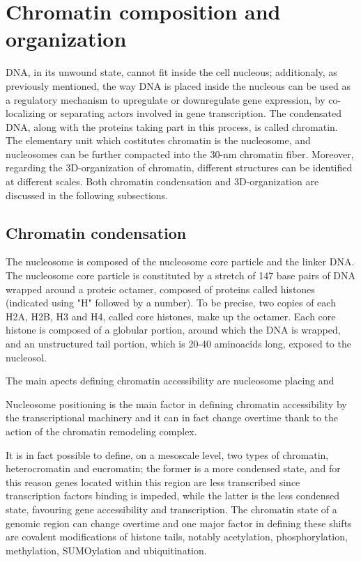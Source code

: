 \section{Chromatin composition and organization}

DNA, in its unwound state, cannot fit inside the cell nucleous; additionaly, as previously mentioned, the way DNA is placed inside the nucleous can be used as a regulatory mechanism to upregulate or downregulate gene expression, by co-localizing or separating actors involved in gene transcription. The condensated DNA, along with the proteins taking part in this process, is called chromatin. The elementary unit which costitutes chromatin is the nucleosome, and nucleosomes can be further compacted into the 30-nm chromatin fiber. Moreover, regarding the 3D-organization of chromatin, different structures can be identified at different scales. Both chromatin condensation and 3D-organization are discussed in the following subsections.

\subsection{Chromatin condensation}
The nucleosome is composed of the nucleosome core particle and the linker DNA. The nucleosome core particle is constituted by a stretch of 147 base pairs of DNA wrapped around a proteic octamer, composed of proteins called histones (indicated using "H" followed by a number). To be precise, two copies of each H2A, H2B, H3 and H4, called core histones, make up the octamer\cite{nucleosomecore1997}. Each core histone is composed of a globular portion, around which the DNA is wrapped, and an unstructured tail portion, which is 20-40 aminoacids long, exposed to the nucleosol. 

The main apects defining chromatin accessibility are nucleosome placing and 

Nucleosome positioning is the main factor in defining chromatin accessibility by the transcriptional machinery and it can in fact change overtime thank to the action of the chromatin remodeling complex.

It is in fact possible to define, on a mesoscale level, two types of chromatin, heterocromatin and eucromatin; the former is a more condensed state, and for this reason genes located within this region are less transcribed since transcription factors binding is impeded, while the latter is the less condensed state, favouring gene accessibility and transcription. The chromatin state of a genomic region can change overtime and one major factor in defining these shifts are covalent modifications of histone tails, notably acetylation, phosphorylation, methylation, SUMOylation and ubiquitination\cite{histonemodifications2020}.


